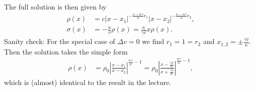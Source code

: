 \documentclass[english, parskip=full]{scrartcl}
\begin{document}
The full solution is then given by
\begin{align}
\rho(x) &= c|x-x_1|^{-\frac{\kappa - \alpha\gamma}{\kappa}r_1} |x-x_2|^{-\frac{\kappa - \alpha\gamma}{\kappa}r_2},\\
\sigma(x) &= -\frac{u}{\bar{v}} \rho(x) = \frac{\kappa}{\gamma\bar{v}} x\rho(x).
\end{align}
Sanity check:
For the special case of $\Delta v=0$ we find $r_1=1=r_2$ and $x_{1,2} = \pm \frac{\gamma\bar{v}}{\kappa}$.
Then the solution takes the simple form
\begin{align}
\rho(x) &= \rho_0\left\vert \frac{x - x_1}{x - x_2} \right\vert^{\frac{\alpha\gamma}{\kappa} - 1} = \rho_0\left\vert \frac{x - \frac{\gamma\bar{v}}{\kappa}}{x + \frac{\gamma\bar{v}}{\kappa}} \right\vert^{\frac{\alpha\gamma}{\kappa} - 1},
\end{align}
which is (almost) identical to the result in the lecture.
\end{document}
